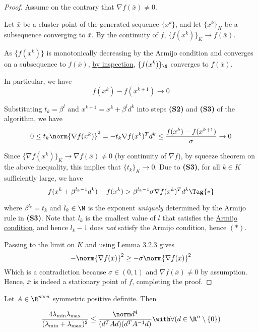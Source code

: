 \begin{proof}
  \def\xk{\{x^k\}}
  \def\grad#1{\nabla f(#1)}
  Assume on the contrary that $\grad{\bar x}\neq0$.

  Let $\bar x$ be a cluster point of the generated sequence $\xk$, and let
  $\xk_K$ be a subsequence converging to $\bar x$. By the continuity of $f$,
  $\{f(x^k)\}_K\to f(\bar x)$.

  As $\{f(x^k)\}$ is monotonically decreasing by the Armijo condition and
  converges on a subsequence to $f(\bar x)$, \href{aaf3ba6}{by inspection},
  $\{f(x^k)\}_\N$ converges to $f(\bar x)$.

  In particular, we have
  $$f(x^k)-f(x^{k+1})\to0$$

  Substituting $t_k=\beta^l$ and $x^{k+1}=x^k+\beta^ld^k$ into steps
  \textbf{(S2)} and \textbf{(S3)} of the algorithm, we have
  $$
    0\leq
    t_k\norm{\grad{x^k}}^2=
    -t_k\grad{x^k}^Td^k\leq
    \frac{f(x^k)-f(x^{k+1})}\sigma\to0
  $$

  Since $\{\grad{x^k}\}_K\to\grad{\bar x}\neq0$ (by continuity of $\nabla f$), by
  squeeze theorem on the above inequality, this implies that $\{t_k\}_K\to0$. Due
  to \textbf{(S3)}, for all $k\in K$ sufficiently large, we have
  \begin{equation*}
    f(x^k+\beta^{l_k-1}d^k)-f(x^k)>\beta^{l_k-1}\sigma\grad{x^k}^Td^k\Tag{*}
  \end{equation*}

  where $\beta^{l_k}=t_k$ and $l_k\in\N$ is the exponent \textit{uniquely}
  determined by the Armijo rule in \textbf{(S3)}. Note that $l_k$ is the smallest
  value of $l$ that satisfies the \href{fefb024}{Armijo condition}, and hence
  $l_k-1$ does \textit{not} satisfy the Armijo condition, hence $(*)$.

  Passing to the limit on $K$ and using \href{f8e1f12}{Lemma 3.2.3} gives
  $$
    -\norm{\nabla f(\bar x)}^2\geq-\sigma\norm{\nabla f(\bar x)}^2
  $$
  Which is a contradiction because $\sigma\in(0,1)$ and $\nabla f(\bar
  x)\neq0$ by assumption. Hence, $\bar x$ is indeed a stationary point
  of $f$, completing the proof.
\end{proof}

\label{eb4e630}

Let $A\in\R^{n\times n}$ symmetric positive definite. Then

\begin{equation*}
  \def\l{\lambda_{\min}}\def\L{\lambda_{\max}}
  \frac{4\l\L}{(\l+\L)^2}\leq\frac{\norm d^4}{(d^TAd)(d^TA^{-1}d)}
  \with\forall(d\in\R^n\setminus\{0\})
\end{equation*}

